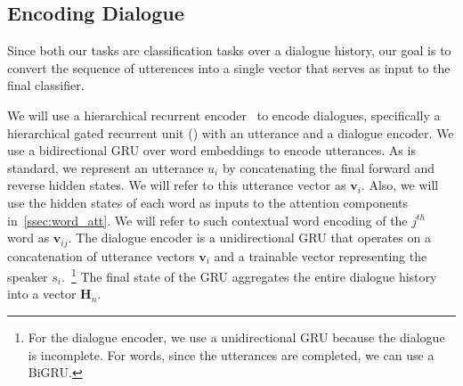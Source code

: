 \subsection{Encoding Dialogue}
\label{ssec:dialog_rep}




Since both our tasks are classification tasks over a dialogue
history, our goal is to convert the sequence of utterences into a
single vector that serves as input to the final classifier.

We will use a hierarchical recurrent encoder~\cite[and
others]{li2015hierarchical,sordoni2015hierarchical,serban2016building}
to encode dialogues, specifically a hierarchical gated recurrent
unit (\HGRU) with an utterance and a dialogue encoder. We use a
bidirectional GRU over word embeddings to encode utterances. As is
standard, we represent an utterance $u_i$ by concatenating the final
forward and reverse hidden states. We will refer to this utterance
vector as $\bm{v}_i$. Also, we will use the hidden states of
each word as inputs to the attention components in~\autoref{ssec:word_att}. We will refer to such contextual word
encoding of the $j^{th}$ word as $\bm{v}_{ij}$. The dialogue encoder
is a unidirectional GRU that operates on a concatenation of
utterance vectors $\bm{v}_i$ and a trainable vector representing the
speaker $s_i$.~\footnote{For the dialogue encoder, we use a
  unidirectional GRU because the dialogue is incomplete. For words,
  since the utterances are completed, we can use a BiGRU.} The final
state of the GRU aggregates the entire dialogue history into a
vector $\bm{H}_n$.


